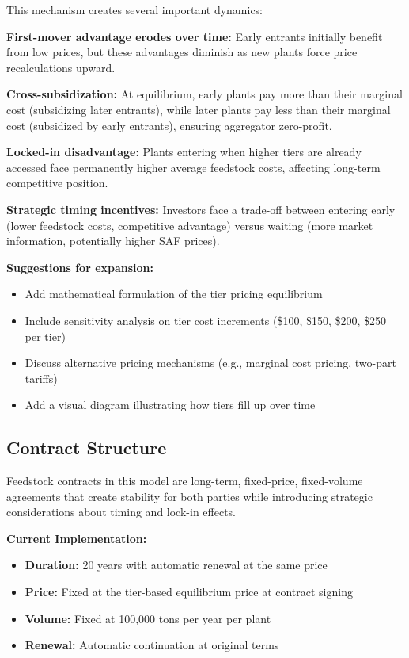 \documentclass[10.5pt]{article}
\begin{document}
This mechanism creates several important dynamics:

\textbf{First-mover advantage erodes over time:} Early entrants initially benefit from low prices, but these advantages diminish as new plants force price recalculations upward.

\textbf{Cross-subsidization:} At equilibrium, early plants pay more than their marginal cost (subsidizing later entrants), while later plants pay less than their marginal cost (subsidized by early entrants), ensuring aggregator zero-profit.

\textbf{Locked-in disadvantage:} Plants entering when higher tiers are already accessed face permanently higher average feedstock costs, affecting long-term competitive position.

\textbf{Strategic timing incentives:} Investors face a trade-off between entering early (lower feedstock costs, competitive advantage) versus waiting (more market information, potentially higher SAF prices).

\textbf{Suggestions for expansion:}
\begin{itemize}
    \item Add mathematical formulation of the tier pricing equilibrium
    \item Include sensitivity analysis on tier cost increments (\$100, \$150, \$200, \$250 per tier)
    \item Discuss alternative pricing mechanisms (e.g., marginal cost pricing, two-part tariffs)
    \item Add a visual diagram illustrating how tiers fill up over time
\end{itemize}

\subsection{Contract Structure}

Feedstock contracts in this model are long-term, fixed-price, fixed-volume agreements that create stability for both parties while introducing strategic considerations about timing and lock-in effects.

\textbf{Current Implementation:}
\begin{itemize}
    \item \textbf{Duration:} 20 years with automatic renewal at the same price
    \item \textbf{Price:} Fixed at the tier-based equilibrium price at contract signing
    \item \textbf{Volume:} Fixed at 100,000 tons per year per plant
    \item \textbf{Renewal:} Automatic continuation at original terms
\end{itemize}
\end{document}
